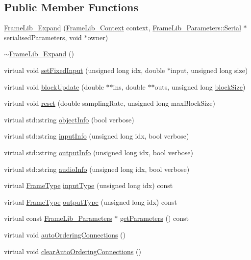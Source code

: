 \subsection*{Public Member Functions}
\begin{DoxyCompactItemize}
\item 
\hyperlink{class_frame_lib___expand_a591240aee95c812856a9835b8014a915}{Frame\+Lib\+\_\+\+Expand} (\hyperlink{class_frame_lib___context}{Frame\+Lib\+\_\+\+Context} context, \hyperlink{class_frame_lib___parameters_1_1_serial}{Frame\+Lib\+\_\+\+Parameters\+::\+Serial} $\ast$serialised\+Parameters, void $\ast$owner)
\item 
\hyperlink{class_frame_lib___expand_a3aa2aa689e4b063fa65fe72be311c45f}{$\sim$\+Frame\+Lib\+\_\+\+Expand} ()
\item 
virtual void \hyperlink{class_frame_lib___expand_a73f7bf4264d45f56f249d6303b3e4c35}{set\+Fixed\+Input} (unsigned long idx, double $\ast$input, unsigned long size)
\item 
virtual void \hyperlink{class_frame_lib___expand_ae712d631cb99284e91c3f318534b3c03}{block\+Update} (double $\ast$$\ast$ins, double $\ast$$\ast$outs, unsigned long \hyperlink{_frame_lib___memory_8cpp_a8ef7d53a4cac28bf580a61f265fcaaa6}{block\+Size})
\item 
virtual void \hyperlink{class_frame_lib___expand_a579f16ec32e05ff84ee766038012fc3f}{reset} (double sampling\+Rate, unsigned long max\+Block\+Size)
\item 
virtual std\+::string \hyperlink{class_frame_lib___expand_ac4527eab2bfb55a38bd796d95f2a2562}{object\+Info} (bool verbose)
\item 
virtual std\+::string \hyperlink{class_frame_lib___expand_ab9017c7fe8562857609fcf819b7d1cdd}{input\+Info} (unsigned long idx, bool verbose)
\item 
virtual std\+::string \hyperlink{class_frame_lib___expand_abba12bed97c0b76095f1e1a699591b3e}{output\+Info} (unsigned long idx, bool verbose)
\item 
virtual std\+::string \hyperlink{class_frame_lib___expand_a94ab97ff114452551719fad428fd2d6e}{audio\+Info} (unsigned long idx, bool verbose)
\item 
virtual \hyperlink{_frame_lib___types_8h_ad495a9f61af7fff07d7e97979d1ab854}{Frame\+Type} \hyperlink{class_frame_lib___expand_abfe5f5550062e7cb351d45111dd2958c}{input\+Type} (unsigned long idx) const
\item 
virtual \hyperlink{_frame_lib___types_8h_ad495a9f61af7fff07d7e97979d1ab854}{Frame\+Type} \hyperlink{class_frame_lib___expand_a5ab23cdee5ca51ed5098b8a99164aa6a}{output\+Type} (unsigned long idx) const
\item 
virtual const \hyperlink{class_frame_lib___parameters}{Frame\+Lib\+\_\+\+Parameters} $\ast$ \hyperlink{class_frame_lib___expand_ae399eee75f1f0d854505eb67f8fb4dd0}{get\+Parameters} () const
\item 
virtual void \hyperlink{class_frame_lib___expand_ab3f908391944bd2d6f5492cc67c19cba}{auto\+Ordering\+Connections} ()
\item 
virtual void \hyperlink{class_frame_lib___expand_adbf3c1e77474e23eacabb395409424e5}{clear\+Auto\+Ordering\+Connections} ()
\end{DoxyCompactItemize}
